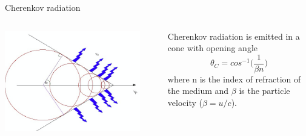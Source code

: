 \begin{frame}{Cherenkov radiation}
\begin{columns}
  \begin{column}{0.60\textwidth}
    \begin{center}
      \includegraphics[width=0.90\textwidth]{./images/schematics/cherenkov_cone.png}\\
    \end{center}
  \end{column}
  \begin{column}{0.40\textwidth}
  {\small
      Cherenkov radiation is emitted in a cone with opening angle
      \begin{equation*}
           \theta_C = cos^{-1} \Big( \frac{1}{\beta n} \Big)
      \end{equation*}
      where n is the index of refraction of the medium and $\beta$ is the particle velocity ($\beta=u/c$).
  }
  \end{column}
\end{columns}

\end{frame}

%
%
%

